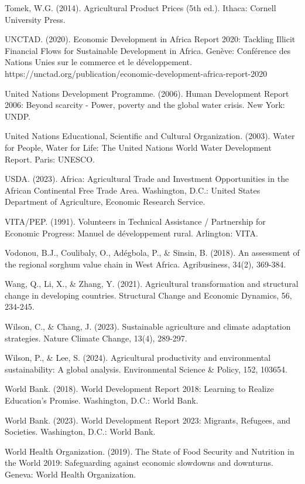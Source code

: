 \documentclass[12pt,oneside]{report}
\begin{document}
Tomek, W.G. (2014). Agricultural Product Prices (5th ed.). Ithaca: Cornell University Press.

UNCTAD. (2020). Economic Development in Africa Report 2020: Tackling Illicit Financial Flows for Sustainable Development in Africa. Genève: Conférence des Nations Unies sur le commerce et le développement. https://unctad.org/publication/economic-development-africa-report-2020

United Nations Development Programme. (2006). Human Development Report 2006: Beyond scarcity - Power, poverty and the global water crisis. New York: UNDP.

United Nations Educational, Scientific and Cultural Organization. (2003). Water for People, Water for Life: The United Nations World Water Development Report. Paris: UNESCO.

USDA. (2023). Africa: Agricultural Trade and Investment Opportunities in the African Continental Free Trade Area. Washington, D.C.: United States Department of Agriculture, Economic Research Service.

VITA/PEP. (1991). Volunteers in Technical Assistance / Partnership for Economic Progress: Manuel de développement rural. Arlington: VITA.

Vodonou, B.J., Coulibaly, O., Adégbola, P., \& Sinsin, B. (2018). An assessment of the regional sorghum value chain in West Africa. Agribusiness, 34(2), 369-384.

Wang, Q., Li, X., \& Zhang, Y. (2021). Agricultural transformation and structural change in developing countries. Structural Change and Economic Dynamics, 56, 234-245.

Wilson, C., \& Chang, J. (2023). Sustainable agriculture and climate adaptation strategies. Nature Climate Change, 13(4), 289-297.

Wilson, P., \& Lee, S. (2024). Agricultural productivity and environmental sustainability: A global analysis. Environmental Science \& Policy, 152, 103654.

World Bank. (2018). World Development Report 2018: Learning to Realize Education's Promise. Washington, D.C.: World Bank.

World Bank. (2023). World Development Report 2023: Migrants, Refugees, and Societies. Washington, D.C.: World Bank.

World Health Organization. (2019). The State of Food Security and Nutrition in the World 2019: Safeguarding against economic slowdowns and downturns. Geneva: World Health Organization.
\end{document}
